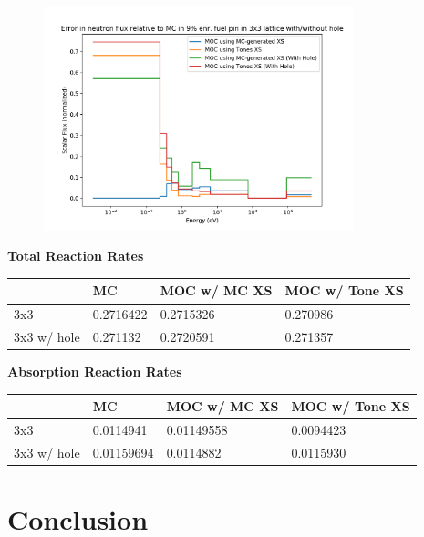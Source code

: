 \documentclass{beamer}
\begin{document}
\begin{frame}
\begin{figure}
\includegraphics[width=0.8\textwidth]{error_3x3_with_without_hole}
\end{figure}
\end{frame}




\begin{frame}
  \begin{table}[]
    \textbf{Total Reaction Rates}\\
\begin{tabular}{|l|l|l|l|}\hline
  & MC & MOC w/ MC XS & MOC w/ Tone XS\\\hline
3x3 & 0.2716422& 0.2715326& 0.270986\\\hline
3x3 w/ hole  & 0.271132& 0.2720591& 0.271357\\\hline
\end{tabular}
\end{table}

  \begin{table}[]
    \textbf{Absorption Reaction Rates}\\
\begin{tabular}{|l|l|l|l|}\hline
  & MC & MOC w/ MC XS & MOC w/ Tone XS\\\hline
3x3  & 0.0114941& 0.01149558& 0.0094423\\\hline
3x3 w/ hole & 0.01159694& 0.0114882& 0.0115930\\\hline
\end{tabular}
\end{table}
\end{frame}





\section{Conclusion}
\end{document}
